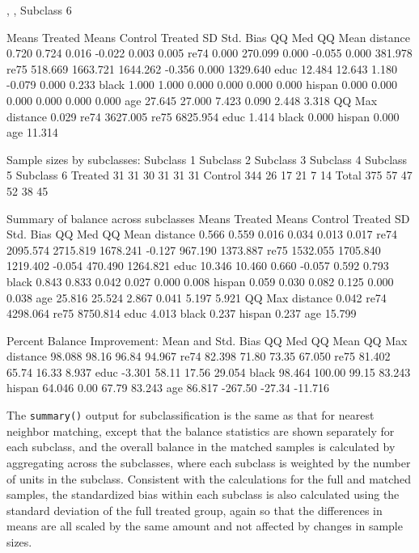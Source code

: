 \documentclass[oneside,letterpaper,titlepage]{article}
\begin{document}
\begin{enumerate}
\begin{Schunk}
\begin{Soutput}
, , Subclass 6

         Means Treated Means Control Treated SD Std. Bias    QQ Med   QQ Mean
distance         0.720         0.724      0.016    -0.022     0.003     0.005
re74             0.000       270.099      0.000    -0.055     0.000   381.978
re75           518.669      1663.721   1644.262    -0.356     0.000  1329.640
educ            12.484        12.643      1.180    -0.079     0.000     0.233
black            1.000         1.000      0.000     0.000     0.000     0.000
hispan           0.000         0.000      0.000     0.000     0.000     0.000
age             27.645        27.000      7.423     0.090     2.448     3.318
            QQ Max
distance     0.029
re74      3627.005
re75      6825.954
educ         1.414
black        0.000
hispan       0.000
age         11.314


Sample sizes by subclasses:
        Subclass 1 Subclass 2 Subclass 3 Subclass 4 Subclass 5 Subclass 6
Treated         31         31         30         31         31         31
Control        344         26         17         21          7         14
Total          375         57         47         52         38         45

Summary of balance across subclasses
         Means Treated Means Control Treated SD Std. Bias  QQ Med  QQ Mean
distance         0.566         0.559      0.016     0.034   0.013    0.017
re74          2095.574      2715.819   1678.241    -0.127 967.190 1373.887
re75          1532.055      1705.840   1219.402    -0.054 470.490 1264.821
educ            10.346        10.460      0.660    -0.057   0.592    0.793
black            0.843         0.833      0.042     0.027   0.000    0.008
hispan           0.059         0.030      0.082     0.125   0.000    0.038
age             25.816        25.524      2.867     0.041   5.197    5.921
           QQ Max
distance    0.042
re74     4298.064
re75     8750.814
educ        4.013
black       0.237
hispan      0.237
age        15.799

Percent Balance Improvement:
         Mean and Std. Bias  QQ Med QQ Mean  QQ Max
distance             98.088   98.16   96.84  94.967
re74                 82.398   71.80   73.35  67.050
re75                 81.402   65.74   16.33   8.937
educ                 -3.301   58.11   17.56  29.054
black                98.464  100.00   99.15  83.243
hispan               64.046    0.00   67.79  83.243
age                  86.817 -267.50  -27.34 -11.716
\end{Soutput}
\end{Schunk}
The \texttt{summary()} output for subclassification is the same as that
for nearest neighbor matching, except that the balance statistics are
shown separately for each subclass, and the overall balance in the
matched samples is calculated by aggregating across the subclasses,
where each subclass is weighted by the number of units in the
subclass.  Consistent with the calculations for the full and matched
samples, the standardized bias within each subclass is also calculated
using the standard deviation of the full treated group, again so that
the differences in means are all scaled by the same amount and not
affected by changes in sample sizes.


\end{enumerate}
\end{document}
